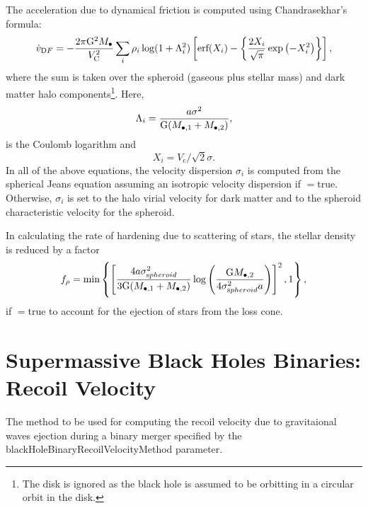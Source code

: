 The acceleration due to dynamical friction is computed using Chandrasekhar's formula:
\begin{equation}
 \dot{v}_{\mathrm DF}=- {2 \pi {\mathrm G}^2 M_\bullet \over V_{\mathrm C}^2} \sum_{i} \rho_i \log(1+\Lambda_i^2) \left[ \hbox{erf}(X_i)-\left\{ {2 X_i \over \sqrt{\pi}} \exp\left(-X_i^2\right) \right\} \right],
\end{equation}
where the sum is taken over the spheroid (gaseous plus stellar mass) and dark matter halo components\footnote{The disk is ignored as the black hole is assumed to be orbitting in a circular orbit in the disk.}. Here,
\begin{equation}
\Lambda_i =  {a \sigma^2  \over {\mathrm G}(M_{\bullet, 1}+M_{\bullet, 2})},
\end{equation}
is the Coulomb logarithm and
\begin{equation}
X_i = V_{\mathrm c} / \sqrt{2} \sigma.
\end{equation}
In all of the above equations, the velocity dispersion $\sigma_i$ is computed from the spherical Jeans equation assuming an isotropic velocity dispersion if {\normalfont \ttfamily [blackHoleBinariesComputeVelocityDispersion]}$=${\normalfont \ttfamily true}. Otherwise, $\sigma_i$ is set to the halo virial velocity for dark matter and to the spheroid characteristic velocity for the spheroid.

In calculating the rate of hardening due to scattering of stars, the stellar density is reduced by a factor \citep{volonteri_assembly_2003}
\begin{equation}
f_\rho = \hbox{min}\left\{ \left[ { 4 a \sigma_{\mathrm spheroid}^2 \over 3 {\mathrm G} (M_{\bullet, 1}+M_{\bullet, 2})} \log\left({{\mathrm G} M_{\bullet, 2} \over 4 \sigma_{\mathrm spheroid}^2  a }\right) \right]^2 , 1 \right\},
\end{equation}
if {\normalfont \ttfamily [stellarDensityChangeBinaryMotion]}$=${\normalfont \ttfamily true} to account for the ejection of stars from the loss cone.

\section{Supermassive Black Holes Binaries: Recoil Velocity}\label{sec:binaryBlackHoleRecoil}

The method to be used for computing the recoil velocity due to gravitaional waves ejection during a binary merger specified by the {\normalfont \ttfamily blackHoleBinaryRecoilVelocityMethod} parameter.

